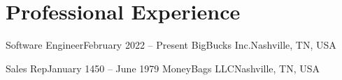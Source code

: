 \section{Professional Experience}
\mySubHeadingListStart

  \mySubHeading
  {Software Engineer}{February 2022 -- Present}
  {BigBucks Inc.}{Nashville, TN, USA}
    \myItemListStart
    \myItemListEnd

  \mySubHeading
  {Sales Rep}{January 1450 -- June 1979}
  {MoneyBags LLC}{Nashville, TN, USA}
    \myItemListStart
    \myItemListEnd

\mySubHeadingListEnd
